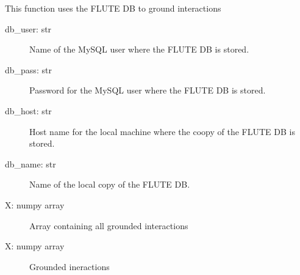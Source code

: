 \documentclass[a4paper,10pt,english]{sphinxmanual}
\begin{document}
\begin{fulllineitems}
\label{\detokenize{run_FLUTE:run_FLUTE.convID}}
\sphinxAtStartPar
This function uses the FLUTE DB to ground interactions
\begin{description}
\item[{db\_user: str}] \leavevmode
\sphinxAtStartPar
Name of the MySQL user where the FLUTE DB is stored.

\item[{db\_pass: str}] \leavevmode
\sphinxAtStartPar
Password for the MySQL user where the FLUTE DB is stored.

\item[{db\_host: str }] \leavevmode
\sphinxAtStartPar
Host name for the local machine where the coopy of the FLUTE DB is stored.

\item[{db\_name: str}] \leavevmode
\sphinxAtStartPar
Name of the local copy of the FLUTE DB.

\item[{X: numpy array}] \leavevmode
\sphinxAtStartPar
Array containing all grounded interactions

\end{description}
\begin{description}
\item[{X: numpy array}] \leavevmode
\sphinxAtStartPar
Grounded ineractions

\end{description}

\end{fulllineitems}

\end{document}
